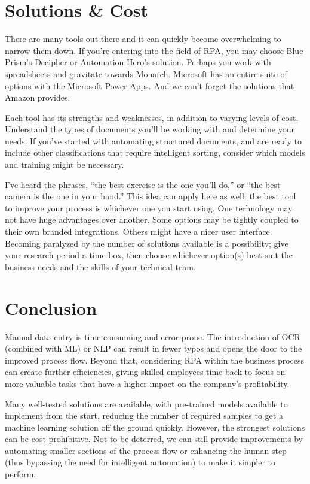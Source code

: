 \documentclass[conference]{IEEEtran}
\begin{document}
\section{Solutions \& Cost} \label{sectionCosts}
There are many tools out there and it can quickly become overwhelming to narrow them down. If you're entering into the field of RPA, you may choose Blue Prism's Decipher or Automation Hero's solution. Perhaps you work with spreadsheets and gravitate towards Monarch. Microsoft has an entire suite of options with the Microsoft Power Apps. And we can't forget the solutions that Amazon provides.

Each tool has its strengths and weaknesses, in addition to varying levels of cost. Understand the types of documents you'll be working with and determine your needs. If you've started with automating structured documents, and are ready to include other classifications that require intelligent sorting, consider which models and training might be necessary.

I've heard the phrases, ``the best exercise is the one you'll do,'' or ``the best camera is the one in your hand.'' This idea can apply here as well: the best tool to improve your process is whichever one you start using. One technology may not have huge advantages over another. Some options may be tightly coupled to their own branded integrations. Others might have a nicer user interface. Becoming paralyzed by the number of solutions available is a possibility; give your research period a time-box, then choose whichever option(s) best suit the business needs and the skills of your technical team.

\section{Conclusion}
Manual data entry is time-consuming and error-prone. The introduction of OCR (combined with ML) or NLP can result in fewer typos and opens the door to the improved process flow. Beyond that, considering RPA within the business process can create further efficiencies, giving skilled employees time back to focus on more valuable tasks that have a higher impact on the company's profitability.

Many well-tested solutions are available, with pre-trained models available to implement from the start, reducing the number of required samples to get a machine learning solution off the ground quickly. However, the strongest solutions can be cost-prohibitive. Not to be deterred, we can still provide improvements by automating smaller sections of the process flow or enhancing the human step (thus bypassing the need for intelligent automation) to make it simpler to perform.
\end{document}
